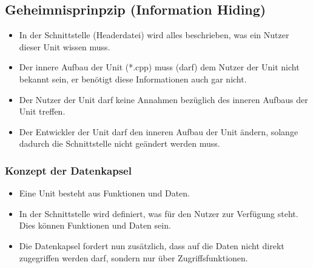 \subsection{Geheimnisprinpzip (Information Hiding)}
\begin{itemize}
	\item In der Schnittstelle (Headerdatei) wird alles beschrieben, was ein Nutzer dieser Unit wissen muss.
	\item Der innere Aufbau der Unit (*.cpp) muss (darf) dem Nutzer der Unit nicht bekannt sein, er benötigt diese Informationen auch gar nicht.
	\item Der Nutzer der Unit darf keine Annahmen bezüglich des inneren Aufbaus der Unit treffen.
	\item Der Entwickler der Unit darf den inneren Aufbau der Unit ändern, solange dadurch die Schnittstelle nicht geändert werden muss.
\end{itemize}

\subsubsection{Konzept der Datenkapsel}
\begin{itemize}
	\item Eine Unit besteht aus Funktionen und Daten.
	\item In der Schnittstelle wird definiert, was für den Nutzer zur Verfügung steht. Dies können Funktionen und Daten sein.
	\item Die Datenkapsel fordert nun zusätzlich, dass auf die Daten nicht direkt zugegriffen werden darf, sondern nur über Zugriffsfunktionen.
\end{itemize}

